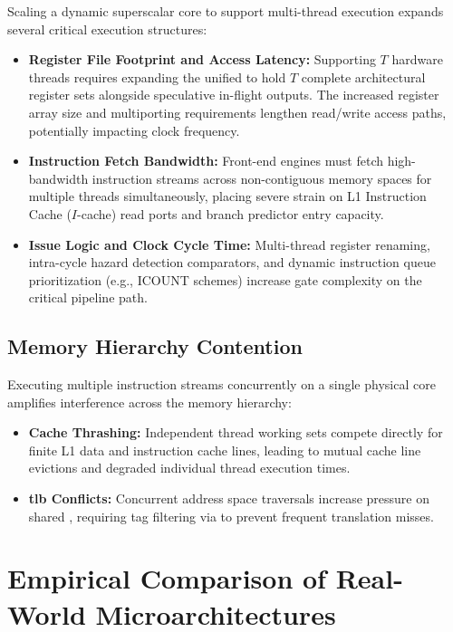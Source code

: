 Scaling a dynamic superscalar core to support multi-thread execution expands several critical execution structures:
\begin{itemize}
    \item \textbf{Register File Footprint and Access Latency:} Supporting $T$ hardware threads requires expanding the unified  to hold $T$ complete architectural register sets alongside speculative in-flight outputs. The increased register array size and multiporting requirements lengthen read/write access paths, potentially impacting clock frequency.
    \item \textbf{Instruction Fetch Bandwidth:} Front-end engines must fetch high-bandwidth instruction streams across non-contiguous memory spaces for multiple threads simultaneously, placing severe strain on L1 Instruction Cache ($I$-cache) read ports and branch predictor entry capacity.
    \item \textbf{Issue Logic and Clock Cycle Time:} Multi-thread register renaming, intra-cycle hazard detection comparators, and dynamic instruction queue prioritization (e.g., \textsf{ICOUNT} schemes) increase gate complexity on the critical pipeline path.
\end{itemize}

\subsection{Memory Hierarchy Contention}

Executing multiple instruction streams concurrently on a single physical core amplifies interference across the memory hierarchy:
\begin{itemize}
    \item \textbf{Cache Thrashing:} Independent thread working sets compete directly for finite L1 data and instruction cache lines, leading to mutual cache line evictions and degraded individual thread execution times.
    \item \textbf{\gls{tlb} Conflicts:} Concurrent address space traversals increase pressure on shared , requiring tag filtering via  to prevent frequent translation misses.
\end{itemize}

\section{Empirical Comparison of Real-World  Microarchitectures}
\label{sec:empirical_ilp_microarchitectures}

